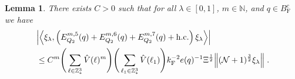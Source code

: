 \documentclass[12pt,a4paper]{article}
\numberwithin{equation}{section}
\newcommand{\NNN}{\mathbb{N}}
\newcommand{\1}{\mathbb{I}}
\newcommand{\F}{\mathrm{F}}
\newcommand{\Z}{\mathbb{Z}}
\newcommand{\NN}{\mathcal{N}}
\newcommand{\half}{\frac{1}{2}}
\newcommand{\eva}[1]{\left\langle #1 \right\rangle}
\theoremstyle{plain}
\newtheorem{lemma}[theorem]{Lemma}
\theoremstyle{definition}
\theoremstyle{remark}
\theoremstyle{plain}
\theoremstyle{definition}
\theoremstyle{remark}
\begin{document}
\begin{lemma} \label{lem:EQ213}
There exists $ C > 0 $ such that for all $ \lambda \in [0,1] $, $ m \in \NNN $, and $ q \in B_{\F}^c $ we have
\begin{equation}
\begin{aligned}
	&\abs{\eva{\xi_\lambda,\left(E^{m,5}_{Q_2}(q) + E^{m,6}_{Q_2}(q) + E^{m,7}_{Q_2}(q) + \mathrm{h.c.}\right) \xi_\lambda }} \\
	&\leq C^m \Bigg(\sum_{\ell \in \Z^3_*} \hat{V}(\ell)^m \Bigg)
		\Bigg( \sum_{\ell_1 \in \Z^3_*}\hat{V}(\ell_1) \Bigg)
		k_{\F}^{-2} e(q)^{-1} \Xi^{\half}
		\norm { (\NN+1)^{\frac 32} \xi_\lambda } \;. \label{eq:estEQ213}
\end{aligned}
\end{equation}
\end{lemma}
\end{document}

